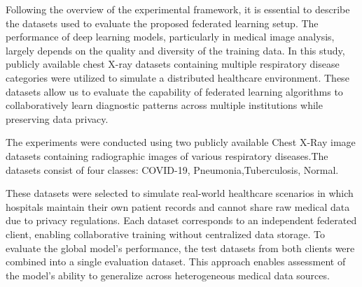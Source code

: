 \documentclass[12pt]{book}
\begin{document}
Following the overview of the experimental framework, it is essential to describe the datasets used to evaluate the proposed federated learning setup. The performance of deep learning models, particularly in medical image analysis, largely depends on the quality and diversity of the training data. In this study, publicly available chest X-ray datasets containing multiple respiratory disease categories were utilized to simulate a distributed healthcare environment. These datasets allow us to evaluate the capability of federated learning algorithms to collaboratively learn diagnostic patterns across multiple institutions while preserving data privacy.\

The experiments were conducted using two publicly available Chest X-Ray image datasets containing radiographic images of various respiratory diseases.The datasets consist of four classes: COVID-19, Pneumonia,Tuberculosis, Normal.\

These datasets were selected to simulate real-world healthcare scenarios in which hospitals maintain their own patient records and cannot share raw medical data due to privacy regulations. Each dataset corresponds to an independent federated client, enabling collaborative training without centralized data storage. To evaluate the global model's performance, the test datasets from both clients were combined into a single evaluation dataset. This approach enables assessment of the model’s ability to generalize across heterogeneous medical data sources.
\end{document}
